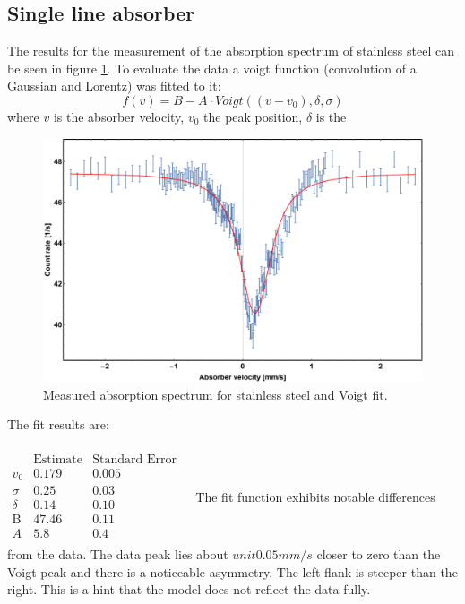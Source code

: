 \subsection{Single line absorber}
The results for the measurement of the absorption spectrum of stainless steel can be seen in figure \ref{fig:single line absorber:fitresult}. To evaluate the data a voigt function (convolution of a Gaussian and Lorentz) was fitted to it:
\begin{equation}
f(v)=B- A \cdot Voigt((v-v_0),\delta,\sigma )
\end{equation}
where $v$ is the absorber velocity, $v_0$ the peak position, $\delta$ is the 
\begin{figure}[H]
\centering
\includegraphics[width=1.0\linewidth]{../results/steel/voigtfittry.pdf}
\caption[Stainless steel spectrum]{Measured absorption spectrum for stainless steel and Voigt fit.}
\label{fig:single line absorber:fitresult}
\end{figure}
The fit results are:\\ \ \\
$\begin{array}{l|llll}
\text{} & \text{Estimate} & \text{Standard Error} \\
\hline
v_0 & 0.179 & 0.005\\
\sigma  & 0.25 & 0.03 \\
\delta  & 0.14 & 0.10\\
\text{B} & 47.46 & 0.11\\
A & 5.8 & 0.4 &\\
\end{array}$
The fit function exhibits notable differences from the data. The data peak lies about $unit{0.05}{mm/s}$ closer to zero than the Voigt peak and there is a noticeable asymmetry. The left flank is steeper than the right. This is a hint that the model does not reflect the data fully.
